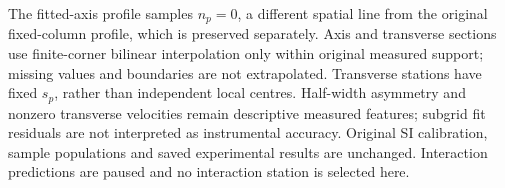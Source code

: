 The fitted-axis profile samples $n_p=0$, a different spatial line from the original
fixed-column profile, which is preserved separately. Axis and transverse sections
use finite-corner bilinear interpolation only within original measured support;
missing values and boundaries are not extrapolated. Transverse stations have
fixed $s_p$, rather than independent local centres. Half-width asymmetry and
nonzero transverse velocities remain descriptive measured features; subgrid fit
residuals are not interpreted as instrumental accuracy. Original SI calibration,
sample populations and saved experimental results are unchanged. Interaction
predictions are paused and no interaction station is selected here.
